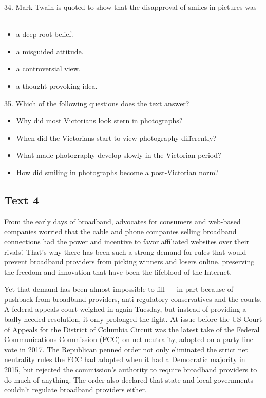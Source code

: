\documentclass[UTF8,11pt]{ctexart}
\begin{document}
34. Mark Twain is quoted to show that the disapproval of smiles in pictures was \_\_\_\_


\begin{itemize}[leftmargin=2em,itemsep=.2em,topsep=.4em]\item[A.] a deep-root belief.
\item[B.] a misguided attitude.
\item[C.] a controversial view.
\item[D.] a thought-provoking idea.
\end{itemize}

35. Which of the following questions does the text answer?


\begin{itemize}[leftmargin=2em,itemsep=.2em,topsep=.4em]\item[A.] Why did most Victorians look stern in photographs?
\item[B.] When did the Victorians start to view photography differently?
\item[C.] What made photography develop slowly in the Victorian period?
\item[D.] How did smiling in photographs become a post-Victorian norm?
\end{itemize}

\subsection*{\textbf{Text 4}}


From the early days of broadband, advocates for consumers and web-based companies worried that the cable and phone companies selling broadband connections had the power and incentive to favor affiliated websites over their rivals’. That’s why there has been such a strong demand for rules that would prevent broadband providers from picking winners and losers online, preserving the freedom and innovation that have been the lifeblood of the Internet.


Yet that demand has been almost impossible to fill — in part because of pushback from broadband providers, anti-regulatory conservatives and the courts. A federal appeals court weighed in again Tuesday, but instead of providing a badly needed resolution, it only prolonged the fight. At issue before the US Court of Appeals for the District of Columbia Circuit was the latest take of the Federal Communications Commission (FCC) on net neutrality, adopted on a party-line vote in 2017. The Republican penned order not only eliminated the strict net neutrality rules the FCC had adopted when it had a Democratic majority in 2015, but rejected the commission’s authority to require broadband providers to do much of anything. The order also declared that state and local governments couldn’t regulate broadband providers either.
\end{document}
